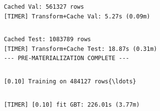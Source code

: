 \documentclass[11pt]{article}
\begin{document}
    \begin{Verbatim}[commandchars=\\\{\}]
Cached Val: 561327 rows
[TIMER] Transform+Cache Val: 5.27s (0.09m)
    \end{Verbatim}

    \begin{Verbatim}[commandchars=\\\{\}]

    \end{Verbatim}

    \begin{Verbatim}[commandchars=\\\{\}]
Cached Test: 1083789 rows
[TIMER] Transform+Cache Test: 18.87s (0.31m)
--- PRE-MATERIALIZATION COMPLETE ---
    \end{Verbatim}

    \begin{Verbatim}[commandchars=\\\{\}]

    \end{Verbatim}

    \begin{Verbatim}[commandchars=\\\{\}]
[0.10] Training on 484127 rows{\ldots}
    \end{Verbatim}

    \begin{Verbatim}[commandchars=\\\{\}]

    \end{Verbatim}

    \begin{Verbatim}[commandchars=\\\{\}]
[TIMER] [0.10] fit GBT: 226.01s (3.77m)
    \end{Verbatim}
\end{document}
